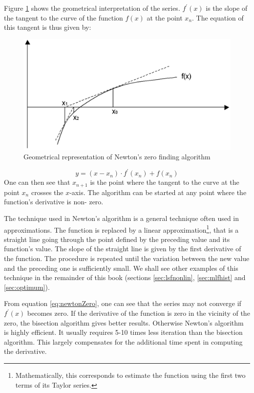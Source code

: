 Figure \ref{fig:newtonZero} shows the geometrical interpretation
of the series. $f^{\prime}\left(x\right)$ is the slope of the
tangent to the curve of the function $f\left(x\right)$ at the
point $x_n$. The equation of this tangent is thus given by:
\begin{figure}
\centering\includegraphics[width=12cm]{Figures/NewtonGraph}
\caption{Geometrical representation of Newton's zero finding
algorithm}\label{fig:newtonZero}
\end{figure}
\begin{equation}
  y=\left(x-x_n\right)\cdot f^{\prime}\left(x_n\right)+f\left(x_n\right)
\end{equation}
One can then see that $x_{n+1}$ is the point where the tangent to
the curve at the point $x_n$ crosses the $x$-axis. The algorithm
can be started at any point where the function's derivative is
non- zero.

The technique used in Newton's algorithm is a general technique
often used in approximations. The function is replaced by a linear
approximation\footnote{Mathematically, this corresponds to
estimate the function using the first two terms of its Taylor
series.}, that is a straight line going through the point defined
by the preceding value and its function's value. The slope of the
straight line is given by the first derivative of the function.
The procedure is repeated until the variation between the new
value and the preceding one is sufficiently small.
We shall see other examples of this technique in the remainder of this book
(\cf sections \ref{sec:lsfnonlin}, \ref{sec:mlfhist} and
\ref{sec:optimum}).

From equation \ref{eq:newtonZero}, one can see that the series may
not converge if $f^{\prime}\left(x\right)$ becomes zero. If the
derivative of the function is zero in the vicinity of the zero,
the bisection algorithm gives better results. Otherwise Newton's
algorithm is highly efficient. It usually requires 5-10 times less
iteration than the bisection algorithm. This largely compensates
for the additional time spent in computing the derivative.


